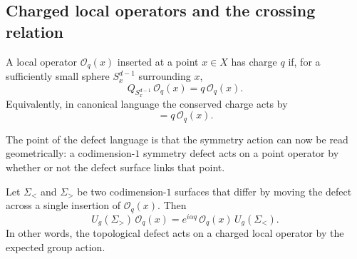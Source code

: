 \subsection{Charged local operators and the crossing relation}

\begin{definition}\label{def:charged-local-operator}
A local operator $\mathcal O_q(x)$ inserted at a point $x\in X$ has charge $q$ if, for a sufficiently small sphere $S_x^{d-1}$ surrounding $x$,
\begin{equation}\label{eq:local-charge}
Q_{S_x^{d-1}}\,\mathcal O_q(x)=q\,\mathcal O_q(x).
\end{equation}
Equivalently, in canonical language the conserved charge acts by
\begin{equation*}
[Q,\mathcal O_q(x)] = q\,\mathcal O_q(x).
\end{equation*}
\end{definition}

\noindent The point of the defect language is that the symmetry action can now be read geometrically: a codimension-$1$ symmetry defect acts on a point operator by whether or not the defect surface links that point.

\begin{proposition}\label{prop:zero-form-crossing}
Let $\Sigma_{<}$ and $\Sigma_{>}$ be two codimension-$1$ surfaces that differ by moving the defect across a single insertion of $\mathcal O_q(x)$. Then
\begin{equation}\label{eq:crossing-relation}
U_g(\Sigma_{>})\,\mathcal O_q(x)
=
e^{i\alpha q}\,\mathcal O_q(x)\,U_g(\Sigma_{<}).
\end{equation}
In other words, the topological defect acts on a charged local operator by the expected group action.
\end{proposition}

